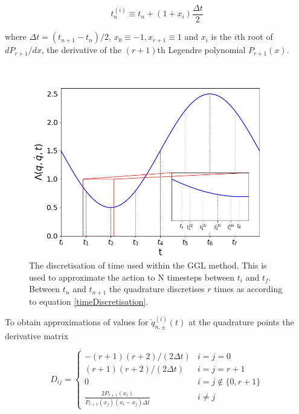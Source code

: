 \documentclass[10pt]{iopart}
\begin{document}
\begin{equation}
\label{timeDiscretisation}
	t_n^{(i)} \equiv t_n + (1+x_i)\frac{\Delta t}{2}
\end{equation}

where $\Delta t = (t_{n+1}-t_n)/2$, $x_0 \equiv -1, x_{r+1} \equiv 1$ and $x_i$ is the $i$th root of $dP_{r+1}/dx$, the derivative of the $(r+1)$th Legendre polynomial $P_{r+1}(x)$. 

\begin{figure}
	\centering
	\label{GGLDiscretisation}
	\includegraphics[width =\columnwidth]{cartoon.jpg}
	\caption{The discretisation of time used within the GGL method. This is used to approximate the action to N timesteps between $t_i$ and $t_f$. Between $t_n$ and $t_{n+1}$ the quadrature discretises $r$ times as according to equation \ref{timeDiscretisation}.}
\end{figure}

To obtain approximations of values for $\dot{q}_{n,\pm}^{(i)}(t)$ at the quadrature points the derivative matrix \cite{Boyd}

\begin{equation}
	D_{ij} = 
	\begin{cases}
		-(r+1)(r+2)/(2\Delta t) &i=j=0 \\
		(r+1)(r+2)/(2\Delta t) &i=j=r+1 \\
		0 &i=j\notin\{0,r+1\} \\
		\frac{2P_{r+1}(x_i)}{P_{r+1}(x_j)(x_i-x_j)\Delta t} &i\neq j
	\end{cases}
\end{equation}
	
\end{document}

